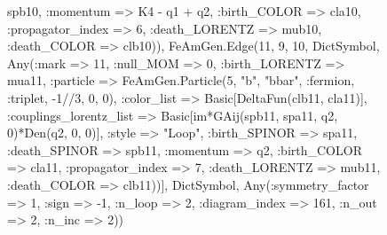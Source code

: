 \documentclass{revtex4}
\begin{document}
\begin{figure}[!htb]
\begin{center}
{spb10, :momentum => K4 - q1 + q2, :birth_COLOR => cla10, :propagator_index => 6, :death_LORENTZ => mub10, :death_COLOR => clb10)), FeAmGen.Edge(11, 9, 10, Dict{Symbol, Any}(:mark => 11, :null_MOM => 0, :birth_LORENTZ => mua11, :particle => FeAmGen.Particle(5, "b", "bbar", :fermion, :triplet, -1//3, 0, 0), :color_list => Basic[DeltaFun(clb11, cla11)], :couplings_lorentz_list => Basic[im*GAij(spb11, spa11, q2, 0)*Den(q2, 0, 0)], :style => "Loop", :birth_SPINOR => spa11, :death_SPINOR => spb11, :momentum => q2, :birth_COLOR => cla11, :propagator_index => 7, :death_LORENTZ => mub11, :death_COLOR => clb11))], Dict{Symbol, Any}(:symmetry_factor => 1, :sign => -1, :n_loop => 2, :diagram_index => 161, :n_out => 2, :n_inc => 2)) 
}
\end{center}
\end{figure}
\end{document}
